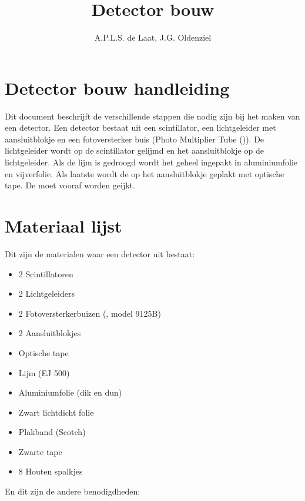 

\title{Detector bouw}
\author{A.P.L.S. de Laat, J.G. Oldenziel} 



\maketitle

\section{Detector bouw handleiding}

Dit document beschrijft de verschillende stappen die nodig zijn bij het
maken van een \hisparc detector. Een detector bestaat uit een
scintillator, een lichtgeleider met aansluitblokje en een fotoversterker
buis (Photo Multiplier Tube (\pmt)). De lichtgeleider wordt op de
scintillator gelijmd en het aansluitblokje op de lichtgeleider. Als de
lijm is gedroogd wordt het geheel ingepakt in aluminiumfolie en
vijverfolie. Als laatste wordt de \pmt op het aansluitblokje geplakt met
optische tape. De \pmt moet vooraf worden geijkt.


\section{Materiaal lijst}

Dit zijn de materialen waar een detector uit bestaat:

\begin{itemize}
    \item 2 Scintillatoren
    \item 2 Lichtgeleiders
    \item 2 Fotoversterkerbuizen (\pmt, model 9125B)
    \item 2 Aansluitblokjes
    \item Optische tape
    \item Lijm (EJ 500)
    \item Aluminiumfolie (dik en dun)
    \item Zwart lichtdicht folie
    \item Plakband (Scotch)
    \item Zwarte tape
    \item 8 Houten spalkjes
\end{itemize}

En dit zijn de andere benodigdheden:

